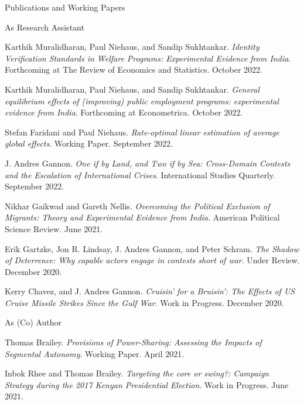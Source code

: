\documentclass[10pt]{resume} %
\begin{document}
	\begin{rSection}{Publications and Working Papers}\itemsep -5pt
		
		\begin{rSubsection}{As Research Assistant}{}{}{}
		\item Karthik Muralidharan, Paul Niehaus, and Sandip Sukhtankar. \textit{Identity Verification Standards in Welfare Programs: Experimental Evidence from India}. Forthcoming at The Review of Economics and Statistics. October 2022. 
		\item Karthik Muralidharan, Paul Niehaus, and Sandip Sukhtankar. \textit{General equilibrium effects of (improving) public employment programs: experimental evidence from India}. Forthcoming at Econometrica. October 2022. 
		\item Stefan Faridani and Paul Niehaus. \textit{Rate-optimal linear estimation of average global effects}. Working Paper. September 2022.
		\item J. Andres Gannon. \textit{One if by Land, and Two if by Sea: Cross-Domain Contests and the Escalation of International Crises}. International Studies Quarterly. September 2022.
		\item Nikhar Gaikwad and Gareth Nellis. \textit{Overcoming the Political Exclusion of Migrants: Theory and Experimental Evidence from India}. American Political Science Review. June 2021. 
		\item Erik Gartzke, Jon R. Lindsay, J. Andres Gannon, and Peter Schram. \textit{The Shadow of Deterrence: Why capable actors engage in contests short of war}. Under Review. December 2020. 
		\item Kerry Chavez, and J. Andres Gannon. \textit{Cruisin’ for a Bruisin’: The Effects of US Cruise Missile Strikes Since the Gulf War}. Work in Progress. December 2020.
		\end{rSubsection}
	
	\begin{rSubsection}{As (Co) Author}{}{}{}
		\item Thomas Brailey. \textit{Provisions of Power-Sharing: Assessing the Impacts of Segmental Autonomy}. Working Paper. April 2021.
		\item Inbok Rhee and Thomas Brailey. \textit{Targeting the core or swing?: Campaign Strategy during the 2017 Kenyan Presidential Election}. Work in Progress. June 2021.
	\end{rSubsection}
	
	\end{rSection}
	
\end{document}
